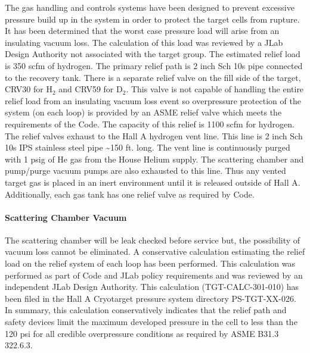\begin{safetyen}{0}{0}
The gas handling and controls systems have been designed to prevent
excessive pressure build up in the system in order to protect the
target cells from rupture. It has been determined that the worst case
pressure load will arise from an insulating vacuum loss. The calculation
of this load was reviewed by a JLab Design Authority not associated
with the target group. The estimated relief load is 350 scfm of hydrogen.
The primary relief path is 2 inch Sch 10s pipe connected to the recovery
tank. There is a separate relief valve on the fill side of the target,
CRV30 for H$_{2}$ and CRV59 for D$_{2}$. This valve is not capable
of handling the entire relief load from an insulating vacuum loss
event so overpressure protection of the system (on each loop) is provided
by an ASME relief valve which meets the requirements of the Code.
The capacity of this relief is 1100 scfm for hydrogen. The relief
valves exhaust to the Hall A hydrogen vent line. This line is 2 inch
Sch 10s IPS stainless steel pipe \textasciitilde{}150 ft. long. The
vent line is continuously purged with 1 psig of He gas from the House
Helium supply. The scattering chamber and pump/purge vacuum pumps
are also exhausted to this line. Thus any vented target gas is placed
in an inert environment until it is released outside of Hall A. Additionally,
each gas tank has one relief valve as required by Code.


\paragraph{Scattering Chamber Vacuum}

\label{sec:cryo_targ_cmb_falure}

The scattering chamber will be leak checked before service but, the
possibility of vacuum loss cannot be eliminated. A conservative calculation
estimating the relief load on the relief system of each loop has been
performed. This calculation was performed as part of Code and JLab
policy requirements and was reviewed by an independent JLab Design
Authority. This calculation (TGT-CALC-301-010) has been filed in the
Hall A Cryotarget pressure system directory PS-TGT-XX-026. In summary,
this calculation conservatively indicates that the relief path and
safety devices limit the maximum developed pressure in the cell to
less than the 120 psi for all credible overpressure conditions as
required by ASME B31.3 322.6.3.


\end{safetyen}
